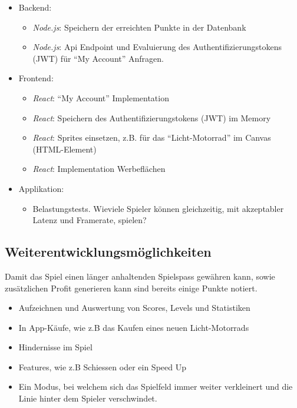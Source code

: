 \documentclass[11pt,ngerman]{article}
\newcommand{\quotes}[1]{``#1''}
\begin{document}
	\begin{itemize}
        \item Backend:
            \begin{itemize}
                \item \textit{Node.js}: Speichern der erreichten Punkte in der Datenbank
                \item \textit{Node.js}:  Api Endpoint und Evaluierung des Authentifizierungstokens (JWT) für \quotes{My Account} Anfragen.
            \end{itemize}
       \item Frontend:
            \begin{itemize}
                \item \textit{React}: \quotes{My Account} Implementation
                \item \textit{React}: Speichern des Authentifizierungstokens (JWT) im Memory
                \item \textit{React}: \Glspl{Sprite} einsetzen, z.B. für das \quotes{Licht-Motorrad} im \Gls{Canvas} (HTML-Element)
                 \item \textit{React}: Implementation Werbeflächen
            \end{itemize}
        \item Applikation:
            \begin{itemize}
                \item Belastungstests. Wieviele Spieler können gleichzeitig, mit akzeptabler Latenz und Framerate, spielen?
            \end{itemize}
	\end{itemize}

    \subsection{Weiterentwicklungsmöglichkeiten}

    Damit das Spiel einen länger anhaltenden Spielspass gewähren kann, sowie zusätzlichen Profit generieren kann sind bereits einige Punkte notiert.

    \begin{itemize}
	    \item Aufzeichnen und Auswertung von Scores, Levels und Statistiken
	    \item In App-Käufe, wie z.B das Kaufen eines neuen Licht-Motorrads
	    \item Hindernisse im Spiel
	    \item Features, wie z.B Schiessen oder ein Speed Up
		\item Ein Modus, bei welchem sich das Spielfeld immer weiter verkleinert und die Linie hinter dem Spieler verschwindet.
	\end{itemize}
\end{document}
